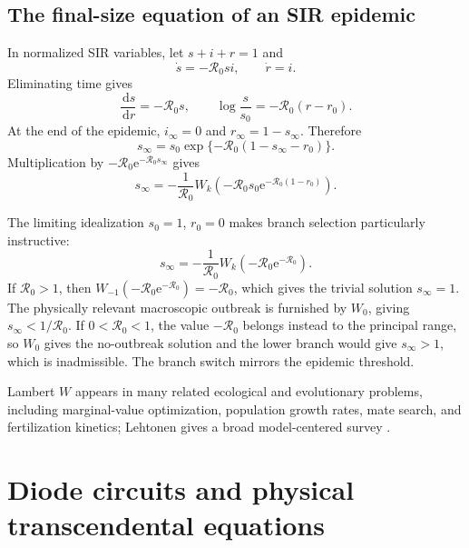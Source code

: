 \documentclass[11pt,openany]{book}
\newcommand{\e}{\mathrm{e}}
\newcommand{\dd}{\,\mathrm{d}}
\theoremstyle{plain}
\theoremstyle{definition}
\theoremstyle{remark}
\begin{document}
\section{The final-size equation of an SIR epidemic}
In normalized SIR variables, let \(s+i+r=1\) and
\[
       \dot s=-\mathcal R_0 s i,
       \qquad
       \dot r=i.
\]
Eliminating time gives
\[
       \frac{\dd s}{\dd r}=-\mathcal R_0s,
       \qquad
       \log\frac{s}{s_0}=-\mathcal R_0(r-r_0).
\]
At the end of the epidemic, \(i_\infty=0\) and
\(r_\infty=1-s_\infty\).  Therefore
\[
 s_\infty
 =s_0\exp\{-\mathcal R_0(1-s_\infty-r_0)\}.
\]
Multiplication by \(-\mathcal R_0\e^{-\mathcal R_0s_\infty}\) gives
\begin{equation}\label{eq:SIRfinal}
 s_\infty=-\frac1{\mathcal R_0}
 W_k\!\left(
  -\mathcal R_0s_0\e^{-\mathcal R_0(1-r_0)}
 \right).
\end{equation}

The limiting idealization \(s_0=1\), \(r_0=0\) makes branch selection
particularly instructive:
\[
 s_\infty=-\frac1{\mathcal R_0}
 W_k(-\mathcal R_0\e^{-\mathcal R_0}).
\]
If \(\mathcal R_0>1\), then
\(W_{-1}(-\mathcal R_0\e^{-\mathcal R_0})=-\mathcal R_0\), which gives the
trivial solution \(s_\infty=1\).  The physically relevant macroscopic
outbreak is furnished by \(W_0\), giving \(s_\infty<1/\mathcal R_0\).  If
\(0<\mathcal R_0<1\), the value \(-\mathcal R_0\) belongs instead to the
principal range, so \(W_0\) gives the no-outbreak solution and the lower branch
would give \(s_\infty>1\), which is inadmissible.  The branch switch mirrors
the epidemic threshold.

Lambert \(W\) appears in many related ecological and evolutionary problems,
including marginal-value optimization, population growth rates, mate search,
and fertilization kinetics; Lehtonen gives a broad model-centered survey
\cite{Lehtonen2016}.

\chapter{Diode circuits and physical transcendental equations}
\label{chap:physics}
\end{document}
